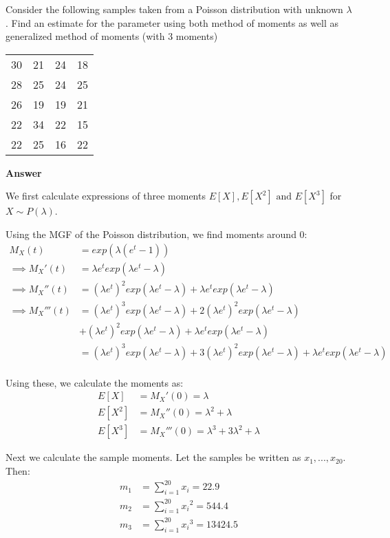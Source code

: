 \documentclass[12pt, oneside]{article}
\begin{document}
\begin{enumerate}
{  Consider the following samples taken from a Poisson distribution with unknown \(\lambda\).
  Find an estimate for the parameter using both method of moments as well as generalized
  method of moments (with 3 moments)

  \begin{center}
  \begin{tabular}{cccc}
    \toprule
    30 & 21 & 24 & 18 \\
    28 & 25 & 24 & 25 \\
    26 & 19 & 19 & 21 \\
    22 & 34 & 22 & 15 \\
    22 & 25 & 16 & 22 \\
    \bottomrule
  \end{tabular}
  \end{center}

  \textbf{Answer}

  We first calculate expressions of three moments \(E[X], E[X^2] \text{ and } E[X^3]\) for
  \(X \sim P(\lambda)\).

  Using the MGF of the Poisson distribution, we find moments around 0:
  \begin{align*}
    M_X(t) &= exp(\lambda(e^t - 1)) \\
    \implies M_X'(t) &= \lambda e^t exp(\lambda e^t - \lambda) \\
    \implies M_X''(t) &= (\lambda e^t)^2 exp(\lambda e^t - \lambda) + \lambda e^t exp(\lambda e^t - \lambda) \\
    \implies M_X'''(t) &= (\lambda e^t)^3 exp(\lambda e^t - \lambda) + 2 (\lambda e^t)^2 exp(\lambda e^t - \lambda) \\
        &+ (\lambda e^t)^2 exp(\lambda e^t - \lambda) + \lambda e^t exp(\lambda e^t - \lambda) \\
        &= (\lambda e^t)^3 exp(\lambda e^t - \lambda) + 3 (\lambda e^t)^2 exp(\lambda e^t - \lambda) + \lambda e^t exp(\lambda e^t - \lambda) \\
  \end{align*}

  Using these, we calculate the moments as:
  \begin{align*}
    E[X] &= M_X'(0) = \lambda \\
    E[X^2] &= M_X''(0) = \lambda^2 + \lambda \\
    E[X^3] &= M_X'''(0) = \lambda^3 + 3\lambda^2 + \lambda
  \end{align*}

  Next we calculate the sample moments. Let the samples be written as \(x_1, ..., x_{20}\). Then:
  \begin{align*}
    m_1 &= \sum_{i=1}^{20} x_i  = 22.9\\
    m_2 &= \sum_{i=1}^{20} {x_i}^2 = 544.4 \\
    m_3 &= \sum_{i=1}^{20} {x_i}^3 = 13424.5 \\
  \end{align*}

}
\end{enumerate}
\end{document}
